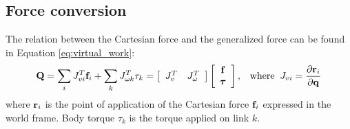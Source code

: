 \subsection{Force conversion}
The relation between the Cartesian force and the generalized force can
be found in Equation \ref{eq:virtual_work}:
\begin{equation}
\label{eqn:force_conversion}
\mathbf{Q} = \sum_i J_{vi}^T \mathbf{f}_i + \sum_k J_{\omega k}^T \tau_k = 
\left[
\begin{array}{cc}
J_{v}^T & J_\omega^T
\end{array}
\right]
\left[
\begin{array}{c}
\mathbf{f} \\
\bm{\tau}
\end{array}
\right] 
, \;\;\;\mathrm{where}\;\;
J_{vi} = \frac{\partial \mathbf{r}_i}{\partial \mathbf{q}}
\end{equation}
where $\mathbf{r}_i$ is the point of application of the Cartesian force
$\mathbf{f}_i$ expressed in the world frame. Body torque $\tau_k$ is the torque
applied on link $k$. 

